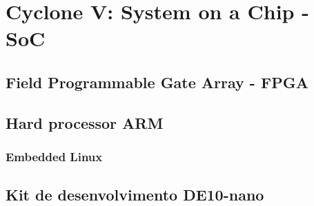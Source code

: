 \chapter{Cyclone V: System on a Chip - SoC}


\section{Field Programmable Gate Array - FPGA}

\section{Hard processor ARM}

\subsection{Embedded Linux}

\section{Kit de desenvolvimento DE10-nano}